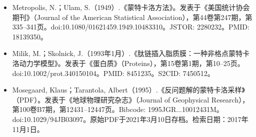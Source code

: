 \begin{itemize}
\item Metropolis, N.；Ulam, S.（1949）.《蒙特卡洛方法》。发表于《美国统计协会期刊》（Journal of the American Statistical Association），第44卷第247期，第335–341页。doi:10.1080/01621459.1949.10483310。JSTOR: 2280232。PMID: 18139350。
\item Milik, M.；Skolnick, J.（1993年1月）.《肽链插入脂质膜：一种非格点蒙特卡洛动力学模型》。发表于《蛋白质》（Proteins），第15卷第1期，第10–25页。doi:10.1002/prot.340150104。PMID: 8451235。S2CID: 7450512。
\item Mosegaard, Klaus；Tarantola, Albert（1995）.《反问题解的蒙特卡洛采样》（PDF）。发表于《地球物理研究杂志》（Journal of Geophysical Research），第100卷B7期，第12431–12447页。Bibcode: 1995JGR...10012431M。doi:10.1029/94JB03097。原始PDF于2021年3月10日存档。检索日期：2017年11月1日。


\end{itemize}
